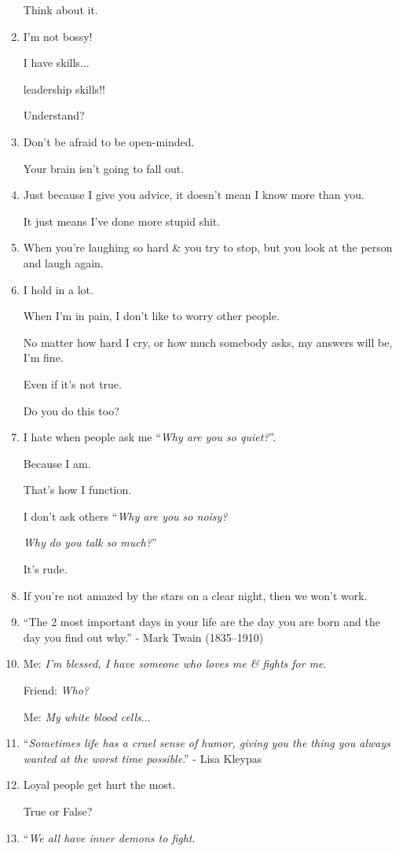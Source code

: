 \documentclass{article}
\begin{document}
\begin{enumerate}
	Think about it.
	\item I'm not bossy!
	
	I have skills$\ldots$
	
	leadership skills!!
	
	Understand?
	\item Don't be afraid to be open-minded.
	
	Your brain isn't going to fall out.
	\item Just because I give you advice, it doesn't mean I know more than you.
	
	It just means I've done more stupid shit.
	\item When you're laughing so hard \& you try to stop, but you look at the person and laugh again.
	\item I hold in a lot.
	
	When I'm in pain, I don't like to worry other people.
	
	No matter how hard I cry, or how much somebody asks, my answers will be, I'm fine.
	
	Even if it's not true.
	
	Do you do this too?
	\item I hate when people ask me ``\textit{Why are you so quiet?}''.
	
	Because I am.
	
	That's how I function.
	
	I don't ask others ``\textit{Why are you so noisy?}
	
	\textit{Why do you talk so much?}''
	
	It's rude.
	\item If you're not amazed by the stars on a clear night, then we won't work.
	\item ``The 2 most important days in your life are the day you are born and the day you find out why.'' - Mark Twain (1835--1910)
	\item Me: \textit{I'm blessed, I have someone who loves me \& fights for me}.
	
	Friend: \textit{Who?}
	
	Me: \textit{My white blood cells}$\ldots$
	\item ``\textit{Sometimes life has a cruel sense of humor, giving you the thing you always wanted at the worst time possible}.'' - Lisa Kleypas
	\item Loyal people get hurt the most.
	
	True or False?
	\item ``\textit{We all have inner demons to fight}.
	

\end{enumerate}
\end{document}
